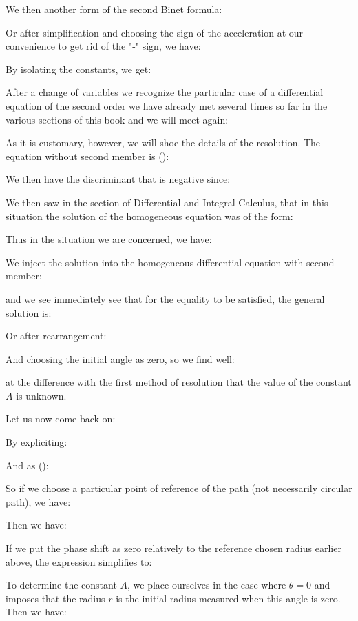 	We then another form of the second Binet formula:
	
	Or after simplification and choosing the sign of the acceleration at our convenience to get rid of the "-" sign, we have:
	
	By isolating the constants, we get:
	
	After a change of variables we recognize the particular case of a differential equation of the second order we have already met several times so far in the various sections of this book and we will meet again:
	
	As it is customary, however, we will shoe the details of the resolution. The equation without second member is ():
	
	We then have the discriminant that is negative since:
	
	We then saw in the section of Differential and Integral Calculus, that in this situation the solution of the homogeneous equation was of the form:
	
	Thus in the situation we are concerned, we have:
	
	We inject the solution into the homogeneous differential equation with second member:
	
	and we see immediately see that for the equality to be satisfied, the general solution is:
	
	Or after rearrangement:
	
	And choosing the initial angle as zero, so we find well:
	
	at the difference with the first method of resolution that the value of the constant $A$ is unknown.
	
	Let us now come back on:
	
	By expliciting:
	
	And as ():
	
	So if we choose a particular point of reference of the path (not necessarily circular path), we have:
	
	Then we have:
	
	If we put the phase shift as zero relatively to the reference chosen radius earlier above, the expression simplifies to:
	
	To determine the constant $A$, we place ourselves in the case where $\theta=0$ and imposes that the radius $r$ is the initial radius measured when this angle is zero. Then we have:
	
